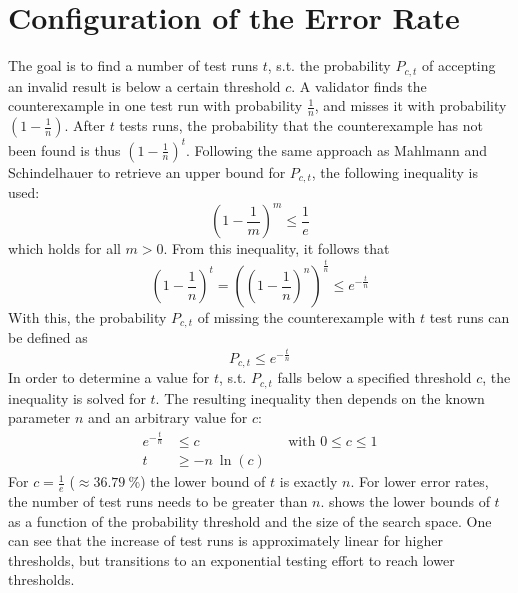 \section{Configuration of the Error Rate}\label{sec:prob_threshold}
The goal is to find a number of test runs $t$, s.t. the probability $P_{c,t}$ of accepting an invalid result is below a certain threshold $c$. A validator finds the counterexample in one test run with probability $\frac{1}{n}$, and misses it with probability $(1-\frac{1}{n})$. After $t$ tests runs, the probability that the counterexample has not been found is thus $(1-\frac{1}{n})^t$. Following the same approach as Mahlmann and Schindelhauer \cite{mahl_schindel_2007} to retrieve an upper bound for $P_{c,t}$, the following inequality is used:
\begin{equation}
(1-\frac{1}{m})^m \leq \frac{1}{e}
\end{equation}
which holds for all $m > 0$. From this inequality, it follows that
\begin{equation}
(1-\frac{1}{n})^t = ((1-\frac{1}{n})^n)^{\frac{t}{n}} \le e^{-\frac{t}{n}}
\end{equation}
With this, the probability $P_{c,t}$ of missing the counterexample with $t$ test runs can be defined as
\begin{equation}
P_{c,t} \le e^{-\frac{t}{n}}
\end{equation}
In order to determine a value for $t$, s.t. $P_{c,t}$ falls below a specified threshold $c$, the inequality is solved for $t$. The resulting inequality then depends on the known parameter $n$ and an arbitrary value for $c$:
\begin{align}\label{eq:test_runs}
    e^{-\frac{t}{n}} &\leq c && \text{with } 0 \leq c\le 1 \nonumber\\
    t &\geq -n\:\ln(c)
\end{align}
For $c = \frac{1}{e}$ ($\approx 36.79\:\%$) the lower bound of $t$ is exactly $n$. For lower error rates, the number of test runs needs to be greater than $n$.  shows the lower bounds of $t$ as a function of the probability threshold and the size of the search space. One can see that the increase of test runs is approximately linear for higher thresholds, but transitions to an exponential testing effort to reach lower thresholds.
